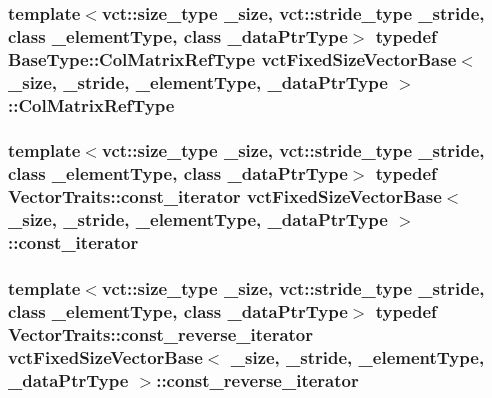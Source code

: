 \subsubsection[{Col\+Matrix\+Ref\+Type}]{\setlength{\rightskip}{0pt plus 5cm}template$<$vct\+::size\+\_\+type \+\_\+size, vct\+::stride\+\_\+type \+\_\+stride, class \+\_\+element\+Type, class \+\_\+data\+Ptr\+Type$>$ typedef {\bf Base\+Type\+::\+Col\+Matrix\+Ref\+Type} {\bf vct\+Fixed\+Size\+Vector\+Base}$<$ \+\_\+size, \+\_\+stride, \+\_\+element\+Type, \+\_\+data\+Ptr\+Type $>$\+::{\bf Col\+Matrix\+Ref\+Type}}\label{classvct_fixed_size_vector_base_a6b661e308612cbe1c894c62812c272e2}
\hypertarget{classvct_fixed_size_vector_base_a178701dffe8173212039cd3edcb8697d}{}
\subsubsection[{const\+\_\+iterator}]{\setlength{\rightskip}{0pt plus 5cm}template$<$vct\+::size\+\_\+type \+\_\+size, vct\+::stride\+\_\+type \+\_\+stride, class \+\_\+element\+Type, class \+\_\+data\+Ptr\+Type$>$ typedef {\bf Vector\+Traits\+::const\+\_\+iterator} {\bf vct\+Fixed\+Size\+Vector\+Base}$<$ \+\_\+size, \+\_\+stride, \+\_\+element\+Type, \+\_\+data\+Ptr\+Type $>$\+::{\bf const\+\_\+iterator}}\label{classvct_fixed_size_vector_base_a178701dffe8173212039cd3edcb8697d}
\hypertarget{classvct_fixed_size_vector_base_a51b27cb7a2a0f7cd5c3352deda9bce98}{}
\subsubsection[{const\+\_\+reverse\+\_\+iterator}]{\setlength{\rightskip}{0pt plus 5cm}template$<$vct\+::size\+\_\+type \+\_\+size, vct\+::stride\+\_\+type \+\_\+stride, class \+\_\+element\+Type, class \+\_\+data\+Ptr\+Type$>$ typedef {\bf Vector\+Traits\+::const\+\_\+reverse\+\_\+iterator} {\bf vct\+Fixed\+Size\+Vector\+Base}$<$ \+\_\+size, \+\_\+stride, \+\_\+element\+Type, \+\_\+data\+Ptr\+Type $>$\+::{\bf const\+\_\+reverse\+\_\+iterator}}\label{classvct_fixed_size_vector_base_a51b27cb7a2a0f7cd5c3352deda9bce98}
\hypertarget{classvct_fixed_size_vector_base_a136da6f4bb90964f3f156533f85416d9}{}
